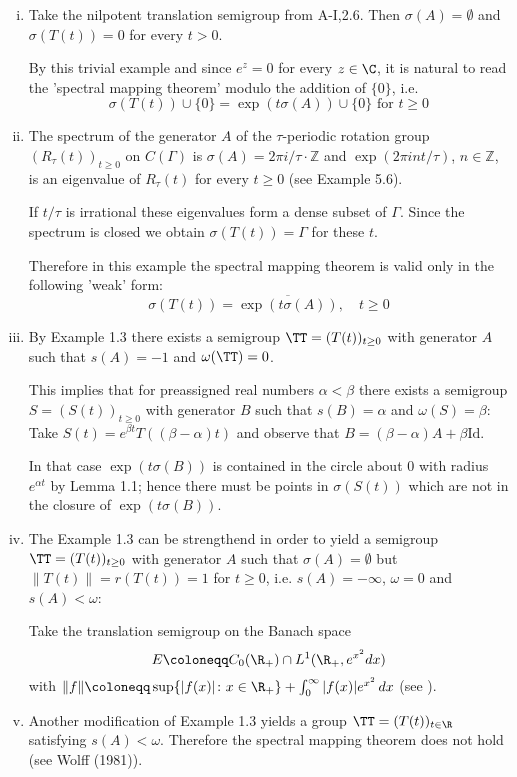 \begin{enumerate}[(i), wide]

\item 
Take the nilpotent translation semigroup from A-I,2.6. Then $\sigma(A) = \emptyset$ and $\sigma(T(t)) = 0$ for every $t > 0$.

By this trivial example and since $e^{z} = 0$ for every $z \in \C$, it is natural to read the 'spectral mapping theorem' modulo the addition of $\{0\}$, i.e.
\[
\sigma(T(t)) \cup \{0\} = \exp(t\sigma(A)) \cup \{0\} \text{ for } t \geq 0
\]
\item 
The spectrum of the generator $A$ of the $\tau$-periodic rotation group $(R_{\tau}(t))_{t \geq 0}$ on $C(\Gamma)$ is $\sigma(A) = 2\pi i/\tau\cdot\mathbb{Z}$ and $\exp(2\pi int/\tau)$, $n \in \mathbb{Z}$, is an eigenvalue of $R_{\tau}(t)$ for every $t \geq 0$ (see Example 5.6).

If $t/\tau$ is irrational these eigenvalues form a dense subset of $\Gamma$.
Since the spectrum is closed we obtain $\sigma(T(t)) = \Gamma$ for these $t$.

Therefore in this example the spectral mapping theorem is valid only in the following 'weak' form:
\[
\sigma(T(t)) = \overline{\exp(t\sigma(A))}, \quad t \geq 0
\]

\item By Example 1.3 there exists a semigroup $\TT = (T(t))_{t \geq 0}$ with generator $A$ such that $s(A) = -1$ and $\omega(\TT) = 0$.

This implies that for preassigned real numbers $\alpha < \beta$ there exists a semigroup $S = (S(t))_{t \geq 0}$ with generator $B$ such that $s(B) = \alpha$ and $\omega(S) = \beta$: Take $S(t) = e^{\beta t}T((\beta - \alpha)t)$ and observe that $B = (\beta-\alpha)A + \beta\text{Id}$.

In that case $\exp(t\sigma(B))$ is contained in the circle about $0$ with radius $e^{\alpha t}$ by Lemma 1.1; hence there must be points in $\sigma(S(t))$ which are not in the closure of $\exp(t\sigma(B))$.

\item The Example 1.3 can be strengthend in order to yield a semigroup $\TT = (T(t))_{t \geq 0}$ with generator $A$ such that $\sigma(A) = \emptyset$ but $\|T(t)\| = r(T(t)) = 1$ for $t \geq 0$, i.e. $s(A) = -\infty$, $\omega = 0$ and $s(A) < \omega$:


\newpage

Take the translation semigroup on the Banach space
\[
E \coloneqq C_{0}(\R_{+}) \cap L^{1}(\R_{+}, e^{x^{2}}dx)
\]
with $\|f\| \coloneqq \sup \{|f(x)| \colon x \in \R_{+}\} + \int_{0}^{\infty} |f(x)|e^{x^{2}} \, dx$ (see \citet{greinervoigtwolff:1981}).

\item Another modification of Example 1.3 yields a group $\TT = (T(t))_{t \in \R}$ satisfying $s(A) < \omega$.
Therefore the spectral mapping theorem does not hold (see Wolff (1981)).
\end{enumerate}

